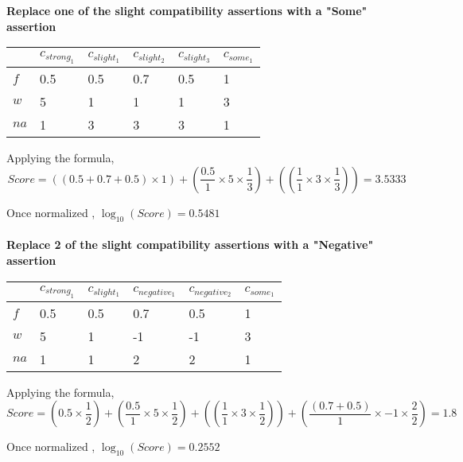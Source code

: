 \documentclass[11pt]{article}
\begin{document}
\begin{large}
\textbf{Replace one of the slight compatibility assertions with a "Some" assertion} \\
\begin{tabular}{|l|l|l|l|l|l|}
\hline
     & $c_{strong_{1}}$ & $c_{slight_{1}}$ & $c_{slight_{2}}$ & $c_{slight_{3}}$ & $c_{some_{1}}$ \\ \hline
$f$  & 0.5              & 0.5              & 0.7              & 0.5              & 1                \\ \hline
$w$  & 5                & 1                & 1                & 1                & 3                \\ \hline
$na$ & 1                & 3                & 3                & 3                & 1                \\ \hline
\end{tabular}

Applying the formula, \\
$$Score = ((0.5 + 0.7 +0.5 ) \times 1) + (\frac{0.5}{1} \times 5 \times \frac{1}{3}) + ((\frac{1}{1} \times 3 \times \frac{1}{3})) = 3.5333 $$

Once normalized , $\log_{10}(Score) =  0.5481$ \\ \\

\textbf{Replace 2 of the slight compatibility assertions with a "Negative" assertion} \\
\begin{tabular}{|l|l|l|l|l|l|}
\hline
     & $c_{strong_{1}}$ & $c_{slight_{1}}$ & $c_{negative_{1}}$ & $c_{negative_{2}}$ & $c_{some_{1}}$ \\ \hline
$f$  & 0.5              & 0.5              & 0.7              & 0.5              & 1                \\ \hline
$w$  & 5                & 1                & -1                & -1                & 3                \\ \hline
$na$ & 1                & 1                & 2                & 2                & 1                \\ \hline
\end{tabular}

Applying the formula, \\
$$Score = (0.5 \times \frac{1}{2}) + (\frac{0.5}{1} \times 5 \times \frac{1}{2}) + ((\frac{1}{1} \times 3 \times \frac{1}{2})) + (\frac{(0.7+0.5)}{1} \times -1 \times \frac{2}{2}) = 1.8 $$

Once normalized , $\log_{10}(Score) =  0.2552$ \\ \\


\end{large}
\end{document}
